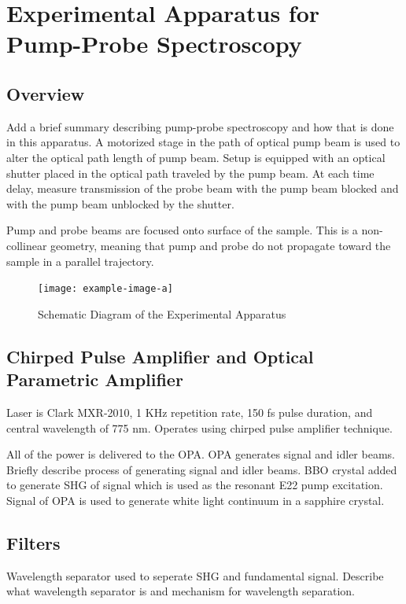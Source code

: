 \section{Experimental Apparatus for Pump-Probe Spectroscopy}

\subsection{Overview}
{\color{red} Add a brief summary describing pump-probe spectroscopy and how that is done in this apparatus}.
A motorized stage in the path of optical pump beam is used to alter the optical path length of pump beam. 
Setup is equipped with an optical shutter placed in the optical path traveled by the pump beam. At each time delay, measure transmission of the probe beam with the pump beam blocked and with the pump beam unblocked by the shutter.  

Pump and probe beams are focused onto surface of the sample. This is a non-collinear geometry, meaning that pump and probe do not propagate toward the sample in a parallel trajectory. 

\begin{figure}[h]
	\centering
	\texttt{[image: example-image-a]}
	\caption{ Schematic Diagram of the Experimental Apparatus}
	\label{fig:sample_absorbance}
\end{figure}


\subsection{Chirped Pulse Amplifier and Optical Parametric Amplifier}
Laser is Clark MXR-2010, 1 KHz repetition rate, 150 fs pulse duration, and central wavelength of 775 nm. Operates using chirped pulse amplifier technique. 

All of the power is delivered to the OPA. OPA generates signal and idler beams. {\color{red} Briefly describe process of generating signal and idler beams}. BBO crystal added to generate SHG of signal which is used as the resonant E22 pump excitation. Signal of OPA is used to generate white light continuum in a sapphire crystal. 

\subsection{Filters}
 Wavelength separator used to seperate SHG and fundamental signal. {\color{red} Describe what wavelength separator is and mechanism for wavelength separation}.
 
